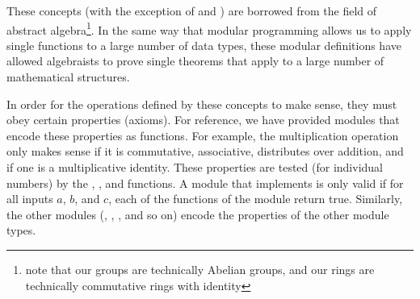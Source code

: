 \documentclass{pset}
\begin{document}
These concepts (with the exception of  and ) are
borrowed from the field of abstract algebra\footnote{note that our groups are
technically Abelian groups, and our rings are technically commutative rings
with identity}.  In the same way that modular programming allows us to apply
single functions to a large number of data types, these modular definitions
have allowed algebraists to prove single theorems that apply to a large number
of mathematical structures.

In order for the operations defined by these concepts to make sense, they must
obey certain properties (axioms).  For reference, we have provided modules that
encode these properties as functions.  For example, the multiplication
operation only makes sense if it is commutative, associative, distributes over
addition, and if one is a multiplicative identity.  These properties are tested
(for individual numbers) by the ,
,  and 
functions.  A module  that implements  is only valid if for
all inputs $a$, $b$, and $c$, each of the functions of the  module return true.  Similarly, the other  modules
(, , , and
so on) encode the properties of the other module types.
\end{document}
